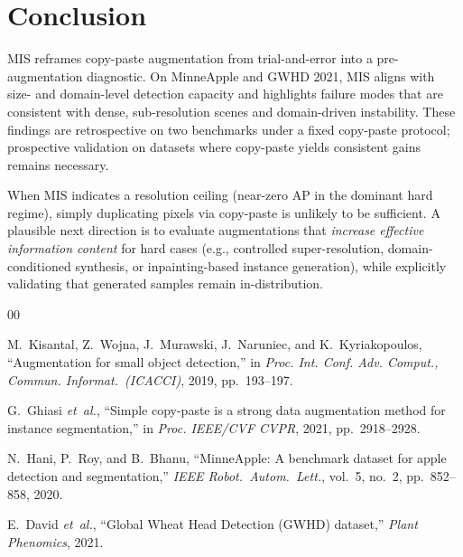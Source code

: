 \documentclass[conference]{IEEEtran}
\begin{document}
\section{Conclusion}
MIS reframes copy-paste augmentation from trial-and-error into a pre-augmentation diagnostic.
On MinneApple and GWHD 2021, MIS aligns with size- and domain-level detection capacity and highlights failure modes that are consistent with dense, sub-resolution scenes
and domain-driven instability.
These findings are retrospective on two benchmarks under a fixed copy-paste protocol; prospective validation on datasets where copy-paste yields consistent gains remains necessary.

When MIS indicates a resolution ceiling (near-zero AP in the dominant hard regime), simply duplicating pixels via copy-paste is unlikely to be sufficient.
A plausible next direction is to evaluate augmentations that \emph{increase effective information content} for hard cases (e.g., controlled super-resolution,
domain-conditioned synthesis, or inpainting-based instance generation), while explicitly validating that generated samples remain in-distribution.

\begin{thebibliography}{00}

M.~Kisantal, Z.~Wojna, J.~Murawski, J.~Naruniec, and K.~Kyriakopoulos,
``Augmentation for small object detection,''
in \textit{Proc. Int. Conf. Adv. Comput., Commun. Informat.\ (ICACCI)}, 2019, pp.~193--197.

G.~Ghiasi \textit{et~al.},
``Simple copy-paste is a strong data augmentation method for instance segmentation,''
in \textit{Proc. IEEE/CVF CVPR}, 2021, pp.~2918--2928.

N.~Hani, P.~Roy, and B.~Bhanu,
``MinneApple: A benchmark dataset for apple detection and segmentation,''
\textit{IEEE Robot.\ Autom.\ Lett.}, vol.~5, no.~2, pp.~852--858, 2020.

E.~David \textit{et~al.},
``Global Wheat Head Detection (GWHD) dataset,''
\textit{Plant Phenomics}, 2021.

\end{thebibliography}
\end{document}
